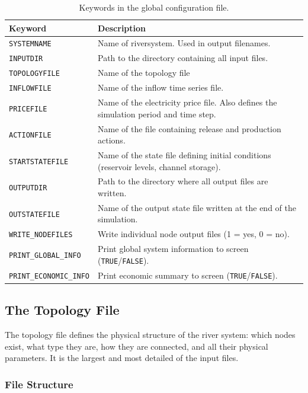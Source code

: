 \documentclass[a4paper, 12pt]{report}
\begin{document}
	\begin{table}[h]
	\centering
	\caption{Keywords in the global configuration file.}
	\label{tab:globalconfig}
	\begin{tabular}{lp{9cm}}
		\hline
		\textbf{Keyword} & \textbf{Description} \\
		\hline
		\texttt{SYSTEMNAME}         & Name of riversystem. Used in output filenames. \\
		\texttt{INPUTDIR}           & Path to the directory containing all input files. \\
		\texttt{TOPOLOGYFILE}       & Name of the topology file \\
		\texttt{INFLOWFILE}         & Name of the inflow time series file. \\
		\texttt{PRICEFILE}          & Name of the electricity price file. Also defines the simulation period and time step. \\
		\texttt{ACTIONFILE}         & Name of the file containing release and production actions. \\
		\texttt{STARTSTATEFILE}     & Name of the state file defining initial conditions (reservoir levels, channel storage). \\
		\texttt{OUTPUTDIR}          & Path to the directory where all output files are written. \\
		\texttt{OUTSTATEFILE}       & Name of the output state file written at the end of the simulation. \\
		\texttt{WRITE\_NODEFILES}   & Write individual node output files (1 = yes, 0 = no). \\
		\texttt{PRINT\_GLOBAL\_INFO}   & Print global system information to screen (\texttt{TRUE}/\texttt{FALSE}). \\
		\texttt{PRINT\_ECONOMIC\_INFO} & Print economic summary to screen (\texttt{TRUE}/\texttt{FALSE}). \\
		\hline
	\end{tabular}
	\end{table}

	\subsection{The Topology File}
	\label{sec:topologyfile}
	The topology file defines the physical structure of the river system: which nodes exist,
	what type they are, how they are connected, and all their physical parameters. It is the largest and most detailed of the input files.

	\subsubsection{File Structure}
\end{document}
